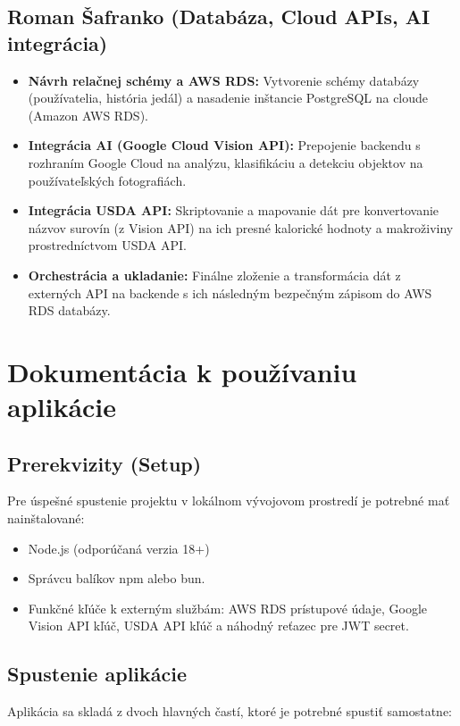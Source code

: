\documentclass[12pt, a4paper]{article}
\begin{document}
\subsection*{Roman Šafranko (Databáza, Cloud APIs, AI integrácia)}
\begin{itemize}
    \item [$\boxtimes$] \textbf{Návrh relačnej schémy a AWS RDS:} Vytvorenie schémy databázy (používatelia, história jedál) a nasadenie inštancie PostgreSQL na cloude (Amazon AWS RDS).
    \item [$\boxtimes$] \textbf{Integrácia AI (Google Cloud Vision API):} Prepojenie backendu s rozhraním Google Cloud na analýzu, klasifikáciu a detekciu objektov na používateľských fotografiách.
    \item [$\boxtimes$] \textbf{Integrácia USDA API:} Skriptovanie a mapovanie dát pre konvertovanie názvov surovín (z Vision API) na ich presné kalorické hodnoty a makroživiny prostredníctvom USDA API.
    \item [$\boxtimes$] \textbf{Orchestrácia a ukladanie:} Finálne zloženie a transformácia dát z externých API na backende s ich následným bezpečným zápisom do AWS RDS databázy.
\end{itemize}

\section{Dokumentácia k používaniu aplikácie}

\subsection{Prerekvizity (Setup)}
Pre úspešné spustenie projektu v lokálnom vývojovom prostredí je potrebné mať nainštalované:
\begin{itemize}
    \item Node.js (odporúčaná verzia 18+)
    \item Správcu balíkov npm alebo bun.
    \item Funkčné kľúče k externým službám: AWS RDS prístupové údaje, Google Vision API kľúč, USDA API kľúč a náhodný reťazec pre JWT secret.
\end{itemize}

\subsection{Spustenie aplikácie}
Aplikácia sa skladá z dvoch hlavných častí, ktoré je potrebné spustiť samostatne:
\end{document}
